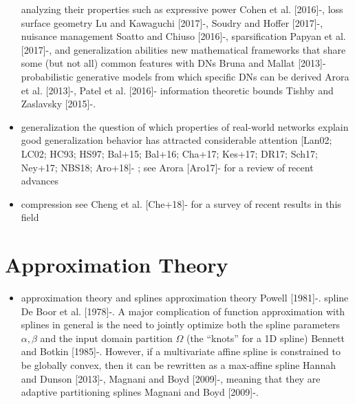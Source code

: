 \documentclass{article}
\begin{document}
\begin{itemize}
		\subitem analyzing their properties such as expressive power Cohen et al. [2016]-\cite{balestriero_mad_2018}, loss surface geometry Lu and Kawaguchi [2017]-\cite{balestriero_mad_2018}, Soudry and Hoffer [2017]-\cite{balestriero_mad_2018}, nuisance management Soatto and Chiuso [2016]-\cite{balestriero_mad_2018}, sparsification Papyan et al. [2017]-\cite{balestriero_mad_2018}, and generalization abilities
		\subitem new mathematical frameworks that share some (but not all) common features with DNs Bruna and Mallat [2013]-\cite{balestriero_mad_2018}
		\subitem probabilistic generative models from which specific DNs can be derived Arora et al. [2013]-\cite{balestriero_mad_2018}, Patel et al. [2016]-\cite{balestriero_mad_2018}
		\subitem information theoretic bounds Tishby and Zaslavsky [2015]-\cite{balestriero_mad_2018}.
	\item generalization
		\subitem the question of which properties of real-world networks explain good generalization behavior has attracted considerable attention [Lan02; LC02; HC93; HS97; Bal+15; Bal+16; Cha+17; Kes+17; DR17; Sch17; Ney+17; NBS18; Aro+18]-\cite{zhou_compressibility_2018} ; see Arora [Aro17]-\cite{zhou_compressibility_2018} for a review of recent advances
	\item compression
		\subitem  see Cheng et al. [Che+18]-\cite{zhou_compressibility_2018} for a survey of recent results in this field
\end{itemize}


\section{Approximation Theory}

\begin{itemize}
	\item approximation theory and splines
		\subitem approximation theory Powell [1981]-\cite{balestriero_mad_2018}. spline De Boor et al. [1978]-\cite{balestriero_mad_2018}. A major complication of function approximation with splines in general is the need to jointly optimize both the spline parameters $\alpha, \beta$ and the input domain partition $\Omega$ (the ``knots'' for a 1D spline) Bennett and Botkin [1985]-\cite{balestriero_mad_2018}. However, if a multivariate affine spline is constrained to be globally convex, then it can be rewritten as a max-affine spline Hannah and Dunson [2013]-\cite{balestriero_mad_2018}, Magnani and Boyd [2009]-\cite{balestriero_mad_2018}, meaning that they are adaptive partitioning splines Magnani and Boyd [2009]-\cite{balestriero_mad_2018}.
\end{itemize}







\end{document}
